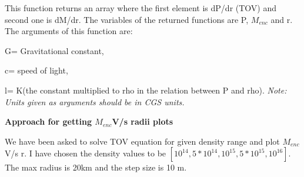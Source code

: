 \documentclass{article}
\begin{document}
This function returns an array where the first element is dP/dr (TOV) and second one is dM/dr. The variables of the returned functions are P, $M_{enc}$ and r.
    The arguments of this function are:
      \vspace{0.2em}
      
        G= Gravitational constant,
          \vspace{0.2em}
          
        c= speed of light,
          \vspace{0.2em}
          
        l= K(the constant multiplied to rho in the relation between P and rho).
          \vspace{0.2em}
        \emph{Note: Units given as arguments should be in CGS units.}
  
  \vspace{0.2em}
  
 \textbf{Approach for getting $M_{enc}$V/s radii plots}
 
 We have been asked to solve TOV equation for given density range and plot $M_{enc}$ V/s r. I have chosen the density values to be $[10^{14}, 5*10^{14}, 10^{15}, 5*10^{15},10^{16}]$. The max radius is 20km and the step size is 10 m. 
 
\end{document}
